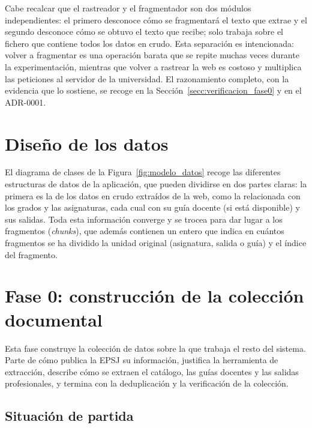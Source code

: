 Cabe recalcar que el rastreador y el fragmentador son dos módulos independientes: el primero desconoce cómo se fragmentará el texto que extrae y el segundo desconoce cómo se obtuvo el texto que recibe; solo trabaja sobre el fichero que contiene todos los datos en crudo. Esta separación es intencionada: volver a fragmentar es una operación barata que se repite muchas veces durante la experimentación, mientras que volver a rastrear la web es costoso y multiplica las peticiones al servidor de la universidad. El razonamiento completo, con la evidencia que lo sostiene, se recoge en la Sección~\ref{secc:verificacion_fase0} y en el ADR-0001.





\section{Diseño de los datos}


El diagrama de clases de la Figura~\ref{fig:modelo_datos} recoge las diferentes estructuras de datos de la aplicación, que pueden dividirse en dos partes claras: la primera es la de los datos en crudo extraídos de la web, como la relacionada con los grados y las asignaturas, cada cual con su guía docente (si está disponible) y sus salidas. Toda esta información converge y se trocea para dar lugar a los fragmentos (\textit{chunks}), que además contienen un entero que indica en cuántos fragmentos se ha dividido la unidad original (asignatura, salida o guía) y el índice del fragmento.




\section{Fase 0: construcción de la colección documental}

Esta fase construye la colección de datos sobre la que trabaja el resto del sistema. Parte de cómo publica la EPSJ su información, justifica la herramienta de extracción, describe cómo se extraen el catálogo, las guías docentes y las salidas profesionales, y termina con la deduplicación y la verificación de la colección.

\subsection{Situación de partida}
\label{secc:fase0_situacion}

